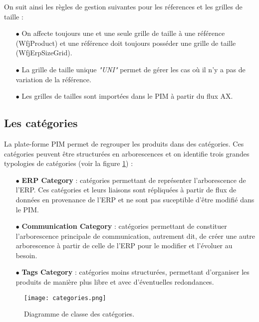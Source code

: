 On suit ainsi les règles de gestion suivantes pour les réferences et les grilles de taille :

\begin{itemize}
    \item[$\bullet$] On affecte toujours une et une seule grille de taille à une référence (WfjProduct) et une référence doit toujours posséder une grille de taille (WfjErpSizeGrid).
    \medskip
    \item[$\bullet$] La grille de taille unique \textit{"UNI"} permet de gérer les cas où il n'y a pas de variation de la référence.

    \medskip
    \item[$\bullet$] Les grilles de tailles sont importées dans le PIM à partir du flux AX.
\end{itemize}

\subsection{Les catégories}

La plate-forme PIM permet de regrouper les produits dans des catégories. Ces catégories peuvent être structurées en arborescences et on identifie trois grandes typologies de catégories (voir la figure \ref{fig:classes-caegories}) :

\medskip

\begin{itemize}
        \item[$\bullet$] \textbf{ERP Category} : catégories permettant de représenter l'arborescence de l'ERP. Ces catégories et leurs liaisons sont répliquées à partir de flux de données en provenance de l'ERP et ne sont pas suceptible d'être modifié dans le PIM.
        
\medskip

        \item[$\bullet$] \textbf{Communication Category} : catégories permettant de constituer l'arborescence principale de communication, autrement dit, de créer une autre arborescence à partir de celle de l'ERP pour le modifier et l'évoluer au besoin.
        
\medskip

        \item[$\bullet$] \textbf{Tags Category} : catégories moins structurées, permettant d'organiser les produits de manière plus libre et avec d'éventuelles redondances.
\end{itemize}

\begin{figure}[ht]
  \centering
  \texttt{[image: categories.png]}
  \caption{Diagramme de classe des catégories.}
  \label{fig:classes-caegories}
\end{figure}
\FloatBarrier


